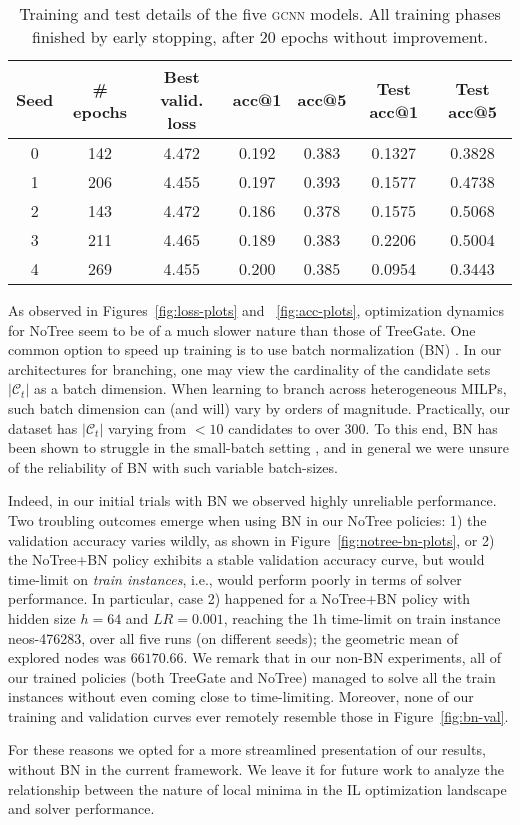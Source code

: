 \documentclass[letterpaper]{article} %
\begin{document}
\begin{table*}[t]
    \caption{Training and test details of the five \textsc{gcnn} models. All training phases finished by early stopping, after 20 epochs without improvement.}
    \label{tab:gcnn_details}
    \centering
    \begin{footnotesize}
    \begin{tabular}{ccccccc}
\toprule
Seed & \# epochs & Best valid. loss & acc@1 & acc@5 & Test acc@1 & Test acc@5\\
\midrule
0 &	142	&	4.472 &	0.192 &	0.383 &	0.1327 & 0.3828\\
1 &	206	&	4.455 &	0.197 &	0.393 &	0.1577 &	0.4738\\
2 &	143	&	4.472 &	0.186 &	0.378 &	0.1575 &	0.5068\\
3 &	211	&	4.465 &	0.189 &	0.383 &	0.2206 &	0.5004\\
4 &	269	&	4.455 &	0.200	&	0.385 &	0.0954 &	0.3443\\
\bottomrule
\end{tabular}
\end{footnotesize}
\end{table*}


{As observed in Figures~\ref{fig:loss-plots} and ~\ref{fig:acc-plots}, optimization dynamics for NoTree seem to be of a much slower nature than those of TreeGate. One common option to speed up training is to use batch normalization (BN) \cite{BatchNorm}. In our architectures for branching, one may view the cardinality of the candidate sets $|\mathcal{C}_t|$ as a batch dimension. When learning to branch across heterogeneous MILPs, such batch dimension can (and will) vary by orders of magnitude. Practically, our dataset has $|\mathcal{C}_t|$ varying from $<10$ candidates to over 300. To this end, BN has been shown to struggle in the small-batch setting \cite{GN}, and in general we were unsure of the reliability of BN with such variable batch-sizes.

Indeed, in our initial trials with BN we observed highly unreliable performance. Two troubling outcomes emerge when using BN in our NoTree policies: 1) the validation accuracy varies wildly, as shown in Figure~\ref{fig:notree-bn-plots}, or 2) the NoTree+BN policy exhibits a stable validation accuracy curve, but would time-limit on \emph{train instances}, i.e., would perform poorly in terms of solver performance. In particular, case 2) happened for a NoTree+BN policy with hidden size $h=64$ and $\mathit{LR}=0.001$, reaching the 1h time-limit on train instance neos-476283, over all five runs (on different seeds); the geometric mean of explored nodes was $66170.66$. We remark that in our non-BN experiments, all of our trained policies (both TreeGate and NoTree) managed to solve all the train instances without even coming close to time-limiting. Moreover, none of our training and validation curves ever remotely resemble those in Figure~\ref{fig:bn-val}.

For these reasons we opted for a more streamlined presentation of our results, without BN in the current framework. We leave it for future work to analyze the relationship between the nature of local minima in the IL optimization landscape and solver performance.
}
\end{document}
